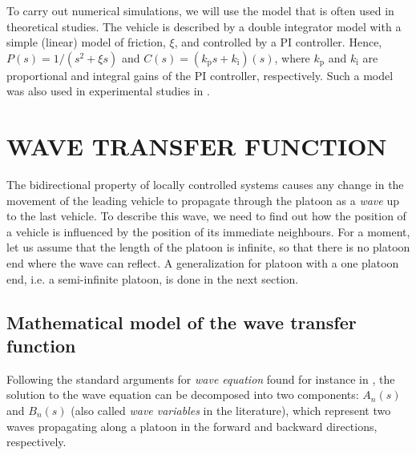 \documentclass[final,5p,times,twocolumn]{elsarticle}
\begin{document}
To carry out numerical simulations, we will use the model that is often used in theoretical studies. The vehicle is described by a double integrator model with a simple (linear) model of friction, $\xi$, and controlled by a PI controller. Hence, $P(s) = 1/(s^2+\xi s)$ and $C(s) = (k_{\text{p}} s +k_{\text{i}})(s)$, where $k_{\text{p}}$ and $k_{\text{i}}$ are proportional and integral gains of the PI controller, respectively. Such a model was also used in experimental studies in \cite{Martinec2012}.

\section{WAVE TRANSFER FUNCTION}

The bidirectional property of locally controlled systems causes any change in the movement of the leading vehicle to propagate through the platoon as a \emph{wave} up to the last vehicle. To describe this wave, we need to find out how the position of a vehicle is influenced by the position of its immediate neighbours. For a moment, let us assume that the length of the platoon is infinite, so that there is no platoon end where the wave can reflect. A generalization for platoon with a one platoon end, i.e. a semi-infinite platoon, is done in the next section.


\subsection{Mathematical model of the wave transfer function}
Following the standard arguments for \emph{wave equation} found for instance in \cite{Asmar2004}, the solution to the wave equation can be decomposed into two components: $A_{n}(s)$ and $B_n(s)$ (also called \emph{wave variables} in the literature), which represent two waves propagating along a platoon in the forward and backward directions, respectively.
\end{document}
